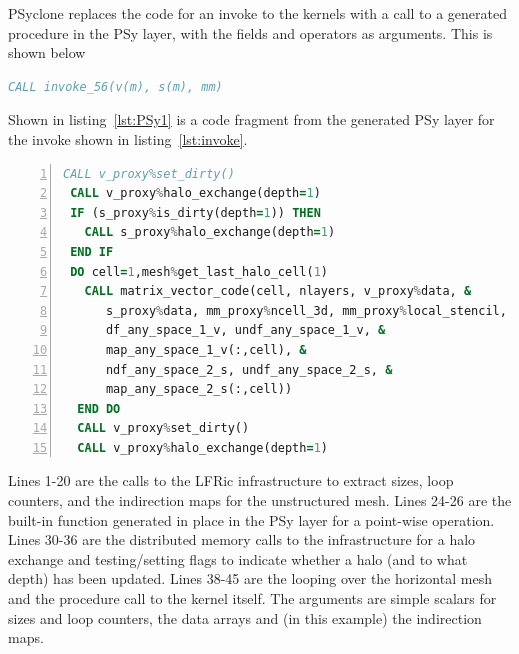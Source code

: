 \documentclass[review,times]{elsarticle}
\begin{document}
PSyclone replaces the code for an invoke to the kernels with a call to a
generated procedure in the PSy layer, with the fields and operators as
arguments. This is shown below
\begin{lstlisting}[language=Fortran,caption={Code fragment showing the
generated Algorithm layer code},label={lst:invoke_56}]
 CALL invoke_56(v(m), s(m), mm)
\end{lstlisting}

Shown in listing~\ref{lst:PSy1} is a code fragment from the generated PSy layer for
the invoke shown in listing~\ref{lst:invoke}.

\begin{lstlisting}[language=Fortran, numbers=left,caption={Code 
fragment of the generated PSy layer},label={lst:PSy1}]
 CALL v_proxy%set_dirty()
 CALL v_proxy%halo_exchange(depth=1)
 IF (s_proxy%is_dirty(depth=1)) THEN
   CALL s_proxy%halo_exchange(depth=1)
 END IF 
 DO cell=1,mesh%get_last_halo_cell(1)
   CALL matrix_vector_code(cell, nlayers, v_proxy%data, &
      s_proxy%data, mm_proxy%ncell_3d, mm_proxy%local_stencil, &
      df_any_space_1_v, undf_any_space_1_v, &
      map_any_space_1_v(:,cell), &
      ndf_any_space_2_s, undf_any_space_2_s, &
      map_any_space_2_s(:,cell))
  END DO 
  CALL v_proxy%set_dirty()
  CALL v_proxy%halo_exchange(depth=1)
\end{lstlisting}
Lines 1-20 are the calls to the LFRic infrastructure to extract
sizes, loop counters, and the indirection maps for the unstructured
mesh. Lines 24-26 are the built-in function generated in place in the
PSy layer for a point-wise operation. Lines 30-36 are the distributed
memory calls to the infrastructure for a halo exchange and
testing/setting flags to indicate whether a halo (and to what depth)
has been updated. Lines 38-45 are the looping over the horizontal mesh
and the procedure call to the kernel itself. The arguments are simple
scalars for sizes and loop counters, the data arrays and (in this example)
the indirection maps. 
\end{document}
